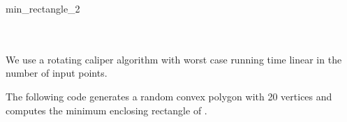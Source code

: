 \begin{ccRefFunction}{min_rectangle_2}
  \ccSeeAlso
  \\
  \\
  \\
  
  \ccImplementation We use a rotating caliper
   algorithm \cite{t-sgprc-83}
  with worst case running time linear in the number of input points.
  
  \ccExample The following code generates a random convex polygon
   with 20 vertices and computes the minimum enclosing
  rectangle of .


\end{ccRefFunction}
    
